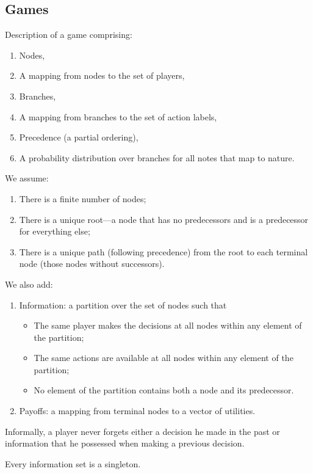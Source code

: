 \documentclass[8pt,letterpaper, landscape]{extarticle} %
\begin{document}
\begin{multicols}{3}
\begin{description}
\subsection{Games}
 Description of a game comprising:
\begin{enumerate}
\item Nodes,
\item A mapping from nodes to the set of players,
\item Branches,
\item A mapping from branches to the set of action labels,
\item Precedence (a partial ordering),
\item A probability distribution over branches for all notes that map to nature.
\end{enumerate}
We assume:
\begin{enumerate}
\item There is a finite number of nodes;
\item There is a unique root---a node that has no predecessors and is a predecessor for everything else;
\item There is a unique path (following precedence) from the root to each terminal node (those nodes without successors).
\end{enumerate}
We also add:
\begin{enumerate}
\item Information: a partition over the set of nodes such that
\begin{itemize}
\item The same player makes the decisions at all nodes within any element of the partition;
\item The same actions are available at all nodes within any element of the partition;
\item No element of the partition contains both a node and its predecessor.
\end{itemize}
\item Payoffs: a mapping from terminal nodes to a vector of utilities.
\end{enumerate}

 Informally, a player never forgets either a decision he made in the past or information that he possessed when making a previous decision.

 Every information set is a singleton.


\end{description}
\end{multicols}
\end{document}
